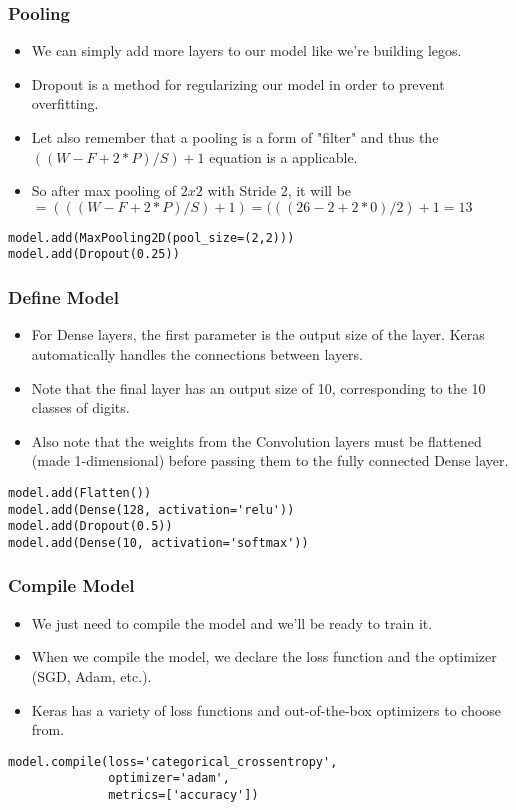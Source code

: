 \begin{frame}[fragile] \frametitle{Pooling}

\begin{itemize}
\item We can simply add more layers to our model like we're building legos.
\item Dropout is a method for regularizing our model in order to prevent overfitting. 
\item Let also remember that a pooling is a form of "filter" and thus the $((W-F+2*P )/S)+ 1$ equation is a applicable.
\item So after max pooling of $2x2$ with Stride 2, it will be $=(((W-F+2*P )/S)+1) = (((26-2+2*0)/2)+1 = 13$
\end{itemize}
\begin{lstlisting}
model.add(MaxPooling2D(pool_size=(2,2)))
model.add(Dropout(0.25))
\end{lstlisting}

\end{frame}

\begin{frame}[fragile] \frametitle{Define Model}

\begin{itemize}
\item For Dense layers, the first parameter is the output size of the layer. Keras automatically handles the connections between layers.
\item Note that the final layer has an output size of 10, corresponding to the 10 classes of digits.
\item Also note that the weights from the Convolution layers must be flattened (made 1-dimensional) before passing them to the fully connected Dense layer.
\end{itemize}
\begin{lstlisting}
model.add(Flatten())
model.add(Dense(128, activation='relu'))
model.add(Dropout(0.5))
model.add(Dense(10, activation='softmax'))
\end{lstlisting}
\end{frame}

\begin{frame}[fragile] \frametitle{Compile Model}

\begin{itemize}
\item We just need to compile the model and we'll be ready to train it. 
\item When we compile the model, we declare the loss function and the optimizer (SGD, Adam, etc.).
\item Keras has a variety of loss functions and out-of-the-box optimizers to choose from.
\end{itemize}
\begin{lstlisting}
model.compile(loss='categorical_crossentropy',
              optimizer='adam',
              metrics=['accuracy'])
\end{lstlisting}
\end{frame}

